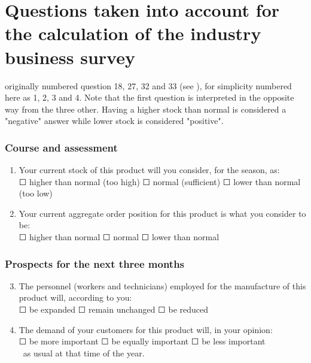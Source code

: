 \documentclass[12pt,a4paper,oneside]{book}
\begin{document}
\section*{Questions taken into account for the calculation of the industry business survey}
\label{Appendix: Question NS975 description}

originally numbered question 18, 27, 32 and 33 (see ), for simplicity numbered here as 1, 2, 3 and 4.
Note that the first question is interpreted in the opposite way from the three other. Having a higher stock than normal is considered a "negative" answer while lower stock is considered "positive".


\subsubsection*{Course and assessment}
\begin{enumerate}
    \item Your current stock of this product will you consider, for the season, as: \\
    $\Square$ higher than normal (too high) $\Square$ normal (sufficient) $\Square$ lower than normal (too low)
    
    \item Your current aggregate order position for this product is what you consider to be: \\
    $\Square$ higher than normal $\Square$ normal $\Square$ lower than normal
\end{enumerate}

\subsubsection*{Prospects for the next three months} 
\begin{enumerate}
\setcounter{enumi}{2}
    \item The personnel (workers and technicians) employed for the manufacture of this product will, according to you: \\
    $\Square$ be expanded $\Square$ remain unchanged $\Square$ be reduced
                        
    \item The demand of your customers for this product will, in your opinion:  \\
    $\Square$ be more important $\Square$ be equally important $\Square$ be less important \\\    
    as usual at that time of the year.
\end{enumerate}
\end{document}
